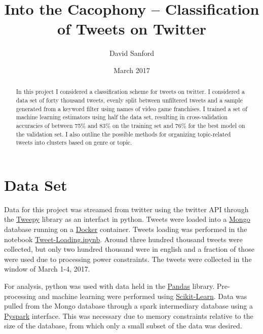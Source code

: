 \documentclass[11pt]{revtex4-1}
\newcommand{\PRE}[1]{{#1}}
\begin{document}
\title{ \PRE{\vspace*{1.5in}} Into the Cacophony -- Classification of
  Tweets on Twitter \PRE{\vspace*{0.3in}}}

\author{David Sanford}

\date{March 2017}

\begin{abstract}
\PRE{\vspace*{.3in}} In this project I considered a classification
scheme for tweets on twitter.  I considered a data set of forty
thousand tweets, evenly split between unfiltered tweets and a sample
generated from a keyword filter using names of video game franchises.
I trained a set of machine learning estimators using half the data
set, resulting in cross-validation accuracies of between 75\% and 83\%
on the training set and 76\% for the best model on the validation set.
I also outline the possible methods for organizing topic-related
tweets into clusters based on genre or topic.
\end{abstract}

\maketitle





\section{Data Set}
\label{sec:data}

Data for this project was streamed from twitter using the twitter API
through the \href{http://pythonhosted.org/tweepy/}{\sc Tweepy} library
as an interfact in python.  Tweets were loaded into a
\href{http://www.mongodb.com/}{\sc Mongo} database running on a
\href{http://www.docker.com/}{\sc Docker} container.  Tweets loading
was performed in the notebook
\href{http://github.com/davidsanford/DSI_Capstone/blob/master/Tweet-Loading.ipynb}{Tweet-Loading.ipynb}.
Around three hundred thousand tweets were collected, but only two
hundred thousand were in english and a fraction of those were used due
to processing power constraints.  The tweets were collected in the
window of March 1-4, 2017.

For analysis, python was used with data held in the
\href{http://pandas.pydata.org/}{\sc Pandas} library.  Pre-processing
and machine learning were performed using
\href{http://scikit-learn.org/stable/}{\sc Scikit-Learn}.  Data was
pulled from the Mongo database through a spark intermediary database
using a
\href{http://spark.apache.org/docs/0.9.0/python-programming-guide.html}{\sc
  Pyspark} interface.  This was necessary due to memory constraints
relative to the size of the database, from which only a small subset
of the data was desired.
\end{document}
